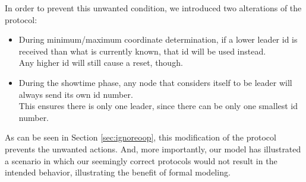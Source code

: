 In order to prevent this unwanted condition, we introduced two alterations of the protocol:

\begin{itemize}
\item During minimum/maximum coordinate determination, if a lower leader id is received than what is currently known, that id will be used instead. \\
Any higher id will still cause a reset, though.
\item During the showtime phase, any node that considers itself to be leader will always send its own id number. \\
This ensures there is only one leader, since there can be only one smallest id number.
\end{itemize}

As can be seen in Section \ref{sec:ignoreoop}, this modification of the protocol prevents the unwanted  actions. And, more importantly, our model has illustrated a scenario in which our seemingly correct protocols would not result in the intended behavior, illustrating the benefit of formal modeling.
